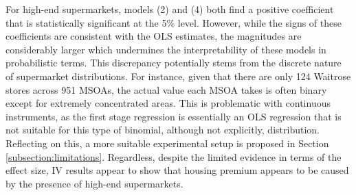 \documentclass{article}
\begin{document}
For high-end supermarkets, models (2) and (4) both find a positive coefficient that is statistically significant at the 5\% level. However, while the signs of these coefficients are consistent with the OLS estimates, the magnitudes are considerably larger which undermines the interpretability of these models in probabilistic terms. This discrepancy potentially stems from the discrete nature of supermarket distributions. For instance, given that there are only 124 Waitrose stores across 951 MSOAs, the actual value each MSOA takes is often binary except for extremely concentrated areas. This is problematic with continuous instruments, as the first stage regression is essentially an OLS regression that is not suitable for this type of binomial, although not explicitly, distribution. Reflecting on this, a more suitable experimental setup is proposed in Section \ref{subsection:limitations}. Regardless, despite the limited evidence in terms of the effect size, IV results appear to show that housing premium appears to be caused by the presence of high-end supermarkets.
\end{document}
